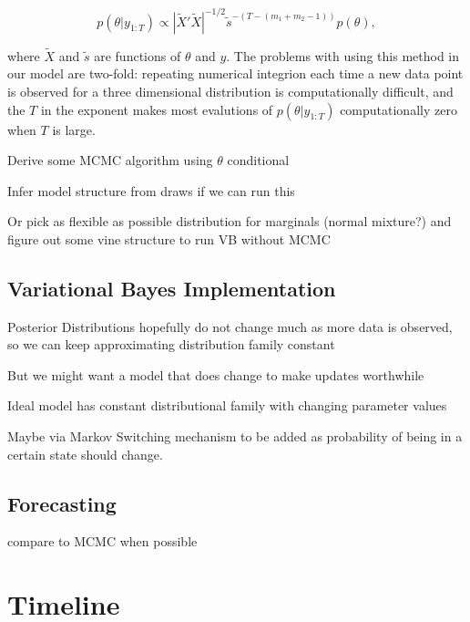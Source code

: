 \documentclass{article}\usepackage[]{graphicx}\usepackage[]{color}
\numberwithin{equation}{section}
\begin{document}
\begin{equation}
\label{exp-sm-marginal}
p(\theta | y_{1:T}) \propto \left| \widetilde{X}' \widetilde{X} \right|^{-1/2} \tilde{s}^{-(T-(m_1 + m_2 - 1))} p(\theta),
\end{equation}

where $\widetilde{X}$ and $\tilde{s}$ are functions of $\theta$ and $y$. The problems with using this method in our model are two-fold: repeating numerical integrion each time a new data point is observed for a three dimensional distribution is computationally difficult, and the $T$ in the exponent makes most evalutions of $p(\theta | y_{1:T})$ computationally zero when $T$ is large.

\begin{list}
\item Derive some MCMC algorithm using $\theta$ conditional
\item Infer model structure from draws if we can run this
\item Or pick as flexible as possible distribution for marginals (normal mixture?) and figure out some vine structure to run VB without MCMC
\end{list}

\subsection{Variational Bayes Implementation}
\begin{list}
\item Posterior Distributions hopefully do not change much as more data is observed, so we can keep approximating distribution family constant
\item But we might want a model that does change to make updates worthwhile
\item Ideal model has constant distributional family with changing parameter values
\item Maybe via Markov Switching mechanism to be added as probability of being in a certain state should change.
\end{list}
\subsection{Forecasting}
compare to MCMC when possible

\section{Timeline}



\end{document}
